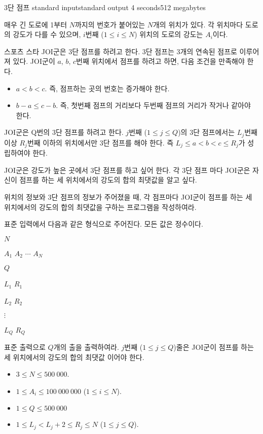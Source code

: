 \begin{problem}{3단 점프}
	{standard input}{standard output}
	{4 seconds}{512 megabytes}{}
	
	매우 긴 도로에 1부터 $N$까지의 번호가 붙어있는 $N$개의 위치가 있다. 각 위치마다 도로의 강도가 다를 수 있으며, $i$번째 ($1 \le i \le N$) 위치의 도로의 강도는 $A_i$이다.
	
	스포츠 스타 JOI군은 3단 점프를 하려고 한다. 3단 점프는 3개의 연속된 점프로 이루어 져 있다. JOI군이 $a$, $b$, $c$번째 위치에서 점프를 하려고 하면, 다음 조건을 만족해야 한다.
	
	\begin{itemize}
		\item $a<b<c$. 즉, 점프하는 곳의 번호는 증가해야 한다.
		\item $b-a \le c-b$. 즉, 첫번째 점프의 거리보다 두번째 점프의 거리가 작거나 같아야 한다.
	\end{itemize}

	JOI군은 Q번의 3단 점프를 하려고 한다. $j$번째 ($1 \le j \le Q$)의 3단 점프에서는 $L_j$번째 이상 $R_j$번째 이하의 위치에서만 3단 점프를 해야 한다. 즉 $L_j \le a < b < c \le R_j$가 성립하여야 한다.
	
	JOI군은 강도가 높은 곳에서 3단 점프를 하고 싶어 한다. 각 3단 점프 마다 JOI군은 자신이 점프를 하는 세 위치에서의 강도의 합의 최댓값을 알고 싶다.
	
	위치의 정보와 3단 점프의 정보가 주어졌을 때, 각 점프마다 JOI군이 점프를 하는 세 위치에서의 강도의 합의 최댓값을 구하는 프로그램을 작성하여라.
	
	
	\InputFile
	
	표준 입력에서 다음과 같은 형식으로 주어진다. 모든 값은 정수이다.

	$N$
	
	$A_1$ $A_2$ $\cdots$ $A_N$
	
	$Q$
	
	$L_1$ $R_1$
	
	$L_2$ $R_2$
	
	$\vdots$
	
	$L_Q$ $R_Q$
	
	\OutputFile
	
	표준 출력으로 $Q$개의 출을 출력하여라. $j$번째 ($1 \le j \le Q$)줄은 JOI군이 점프를 하는 세 위치에서의 강도의 합의 최댓값 이어야 한다.
	
	\Constraints
	
	\begin{itemize}
	
	\item $3 \le N \le 500\ 000$.
	\item $1 \le A_i \le 100\ 000\ 000$ ($1 \le i \le N$).
	\item $1 \le Q \le 500\ 000$
	\item $1 \le L_j < L_j + 2 \le R_j \le N$ ($1 \le j \le Q$).
		

\end{itemize}
\end{problem}
